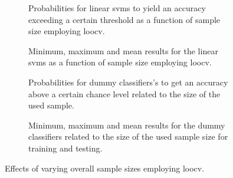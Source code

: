 \documentclass[12pt,a4paper]{article}
\begin{document}
    \begin{figure}
        \captionsetup[subfigure]{justification=justified,singlelinecheck=false}
        \begin{subfigure}[t]{0.61\textwidth}
            
            \caption{Probabilities for linear \acp{svm} to yield an accuracy exceeding a certain threshold as a function of sample size employing \ac{loocv}. }
        \end{subfigure}
        \hspace{3.0mm}
        \begin{subfigure}[t]{0.34\textwidth}
            
            \caption{Minimum, maximum and mean results for the linear \acp{svm} as a function of sample size employing \ac{loocv}.}
        \end{subfigure}

        \vspace{3.0mm}

        \begin{subfigure}[t]{0.61\textwidth}
            
            \caption{Probabilities for dummy classifiers’s to get an accuracy above a certain chance level related to the size of the used sample.}
        \end{subfigure}
        \hspace{3.0mm}
        \begin{subfigure}[t]{0.34\textwidth}
            
            \caption{Minimum, maximum and mean results for the dummy classifiers related to the size of the used sample size for training and testing.}
        \end{subfigure}
        \caption{Effects of varying overall sample sizes employing \ac{loocv}.}
        \label{fig:overall_sample_size_effects}
    \end{figure}
\end{document}
